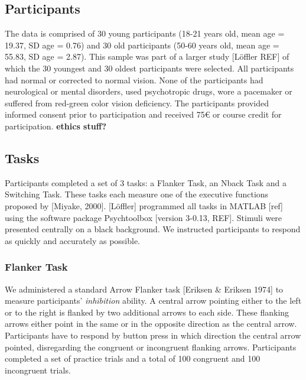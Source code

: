 \documentclass[
  man,floatsintext]{apa7}
\begin{document}
\hypertarget{participants}{%
\subsection{Participants}\label{participants}}

The data is comprised of 30 young participants (18-21 years old, mean age = 19.37, SD age = 0.76) and 30 old participants (50-60 years old, mean age = 55.83, SD age = 2.87). This sample was part of a larger study {[}Löffler REF{]} of which the 30 youngest and 30 oldest participants were selected. All participants had normal or corrected to normal vision. None of the participants had neurological or mental disorders, used psychotropic drugs, wore a pacemaker or suffered from red-green color vision deficiency. The participants provided informed consent prior to participation and received 75€ or course credit for participation. \textbf{ethics stuff?}

\hypertarget{tasks}{%
\subsection{Tasks}\label{tasks}}

Participants completed a set of 3 tasks: a Flanker Task, an Nback Task and a Switching Task. These tasks each measure one of the executive functions proposed by {[}Miyake, 2000{]}. {[}Löffler{]} programmed all tasks in MATLAB {[}ref{]} using the software package Psychtoolbox {[}version 3-0.13, REF{]}. Stimuli were presented centrally on a black background. We instructed participants to respond as quickly and accurately as possible.

\hypertarget{flanker-task}{%
\subsubsection{Flanker Task}\label{flanker-task}}

We administered a standard Arrow Flanker task {[}Eriksen \& Eriksen 1974{]} to measure participants' \emph{inhibition} ability. A central arrow pointing either to the left or to the right is flanked by two additional arrows to each side. These flanking arrows either point in the same or in the opposite direction as the central arrow. Participants have to respond by button press in which direction the central arrow pointed, disregarding the congruent or incongruent flanking arrows. Participants completed a set of practice trials and a total of 100 congruent and 100 incongruent trials.
\end{document}

